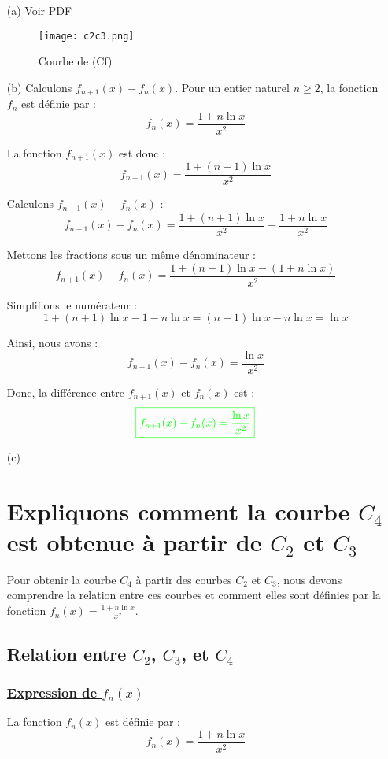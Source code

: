 \documentclass[12pt]{article}
\begin{document}
\begin{enumerate}
\item[(a)] Voir PDF
\\
\begin{figure}[h]
\centering
\texttt{[image: c2c3.png]}
\caption{Courbe de (Cf)}
\label{fig:monimage}
\end{figure}
\item[(b)] Calculons \( f_{n+1}(x)-f_{n}(x) \).
Pour un entier naturel \( n \geq 2 \), la fonction \( f_n \) est définie par :
\[ f_n(x) = \frac{1 + n \ln x}{x^2} \]

La fonction \( f_{n+1}(x) \) est donc :
\[ f_{n+1}(x) = \frac{1 + (n+1) \ln x}{x^2} \]

Calculons \( f_{n+1}(x) - f_n(x) \) :
\[ f_{n+1}(x) - f_n(x) = \frac{1 + (n+1) \ln x}{x^2} - \frac{1 + n \ln x}{x^2} \]

Mettons les fractions sous un même dénominateur :
\[ f_{n+1}(x) - f_n(x) = \frac{1 + (n+1) \ln x - (1 + n \ln x)}{x^2} \]

Simplifions le numérateur :
\[ 1 + (n+1) \ln x - 1 - n \ln x = (n+1) \ln x - n \ln x = \ln x \]

Ainsi, nous avons :
\[ f_{n+1}(x) - f_n(x) = \frac{\ln x}{x^2} \]

Donc, la différence entre \( f_{n+1}(x) \) et \( f_n(x) \) est :
\[ \textcolor{green}{\boxed{f_{n+1}(x) - f_n(x) = \frac{\ln x}{x^2}}} \]
\item[(c)] \section*{Expliquons comment la courbe \(C_4\) est obtenue à partir de \(C_2\) et \(C_3\)}

Pour obtenir la courbe \( C_4 \) à partir des courbes \( C_2 \) et \( C_3 \), nous devons comprendre la relation entre ces courbes et comment elles sont définies par la fonction \( f_n(x) = \frac{1 + n \ln x}{x^2} \).

\subsection*{Relation entre \(C_2\), \(C_3\), et \(C_4\)}

\subsubsection*{\underline{ Expression de } \( f_n(x) \)}
La fonction \( f_n(x) \) est définie par :
\[ f_n(x) = \frac{1 + n \ln x}{x^2} \]


\end{enumerate}
\end{document}
